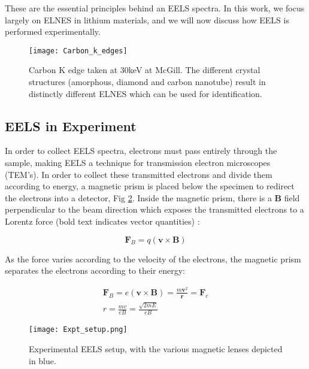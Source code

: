 These are the essential principles behind an EELS spectra.  In this work, we focus largely on ELNES in lithium materials, and we will now discuss how EELS is performed experimentally.

\begin{figure}
	\centering
	\texttt{[image: Carbon\_k\_edges]}
	\caption{Carbon K edge taken at 30keV at McGill. The different crystal structures (amorphous, diamond and carbon nanotube) result in distinctly different ELNES which can be used for identification.   }
	\label{carbon-k-edge}
\end{figure}


\subsection{EELS in Experiment}

In order to collect EELS spectra, electrons must pass entirely through the sample, making EELS a technique for transmission electron microscopes (TEM's)\cite{Egerton}. In order to collect these transmitted electrons and divide them according to energy, a magnetic prism is placed below the specimen to redirect the electrons into a detector,  Fig \ref{prism}.  Inside the magnetic prism, there is a $\mathrm{\textbf{B}}$ field perpendicular to the beam direction which exposes the transmitted electrons to a Lorentz force (bold text indicates vector quantities) \cite{griffiths_em}: 


\begin{equation}
	\textbf{F}_B = q (\textbf{v} \times \textbf{B})
\end{equation}

As the force varies according to the velocity of the electrons, the magnetic prism  separates the electrons according to their energy: 

\begin{gather}
\textbf{F}_B = e (\textbf{v} \times \textbf{B}) =  \frac{m \textbf{v}^2}{\textbf{r}} = \textbf{F}_c \\
 r =  \frac{mv}{eB} = \frac{\sqrt{2mE}}{eB}
\end{gather}

\begin{figure}
 \centering
 \texttt{[image: Expt\_setup.png]}
 \caption{Experimental EELS setup, with the various magnetic lenses depicted in blue.  }
 \label{prism}
 
\end{figure}

